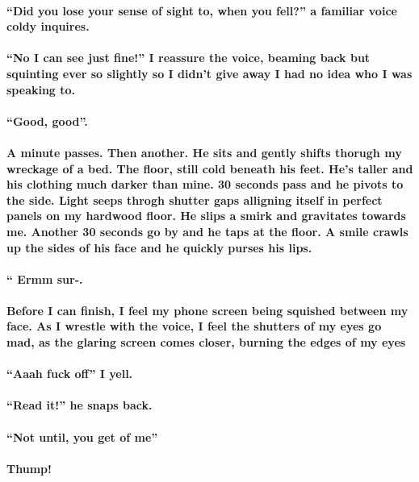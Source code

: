 \documentclass{book}
\begin{document}
\paragraph{``Did you lose your sense of sight to, when you fell?'' a familiar voice coldy inquires.}
\paragraph{``No I can see just fine!'' I reassure the voice, beaming back but squinting ever so slightly so I didn't give away I had no idea who I was speaking to.}
\paragraph{``Good, good''.}
\paragraph{A minute passes. Then another. He sits and gently shifts thorugh my wreckage of a bed. The floor, still cold beneath his feet. He's taller and his clothing much darker than mine. 30 seconds pass and he pivots to the side. Light seeps throgh shutter gaps alligning itself in perfect panels on my hardwood floor. He slips a smirk and gravitates towards me. Another 30 seconds go by and he taps at the floor. A smile crawls up the sides of his face and he quickly purses his lips.}
\paragraph{`` Ermm sur-.}
\paragraph{Before I can finish, I feel my phone screen being squished between my face. As I wrestle with the voice, I feel the shutters of my eyes go mad, as the glaring screen comes closer, burning the edges of my eyes}
\paragraph{``Aaah fuck off'' I yell.}
\paragraph{``Read it!''  he snaps back.}
\paragraph{``Not until, you get of me''}
\paragraph{Thump!}
\end{document}
